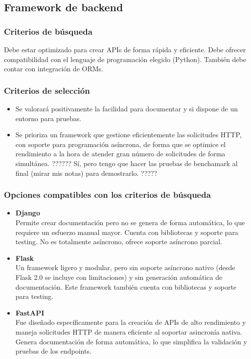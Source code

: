 \subsection{Framework de backend}
\subsubsection{Criterios de búsqueda}
Debe estar optimizado para crear APIs de forma rápida y eficiente.
Debe ofrecer compatibilidad con el lenguaje de programación elegido (Python). También debe contar con integración de ORMs.

\subsubsection{Criterios de selección}
\begin{itemize}
    \item Se valorará positivamente la facilidad para documentar y si dispone de un entorno para pruebas.
    \item Se prioriza un framework que gestione eficientemente las solicitudes HTTP, con soporte para programación asíncrona, de forma que se optimice el rendimiento a la hora de atender gran número de solicitudes de forma simultánea. ?????? Sí, pero tengo que hacer las pruebas de benchamark al final (mirar mis notas) para demostrarlo. ?????
\end{itemize}

\subsubsection{Opciones compatibles con los criterios de búsqueda}
\begin{itemize}
    \item \textbf{Django}\\
        Permite crear documentación pero no se genera de forma automática, lo que requiere un esfuerzo manual mayor. 
        Cuenta con bibliotecas y soporte para testing. No es totalmente asíncrono, ofrece soporte asíncrono parcial.
    \item \textbf{Flask}\\
        Un framework ligero y modular, pero sin soporte asíncrono nativo (desde Flask 2.0 se incluye con limitaciones) y sin generación automática de documentación. Este framework también cuenta con bibliotecas y soporte para testing.
    \item \textbf{FastAPI}\\
        Fue diseñado específicamente para la creación de APIs de alto rendimiento y maneja solicitudes HTTP de manera eficiente al soportar asincronía nativa.
        Genera documentación de forma automática, lo que simplifica la validación y pruebas de los endpoints.
\end{itemize}

